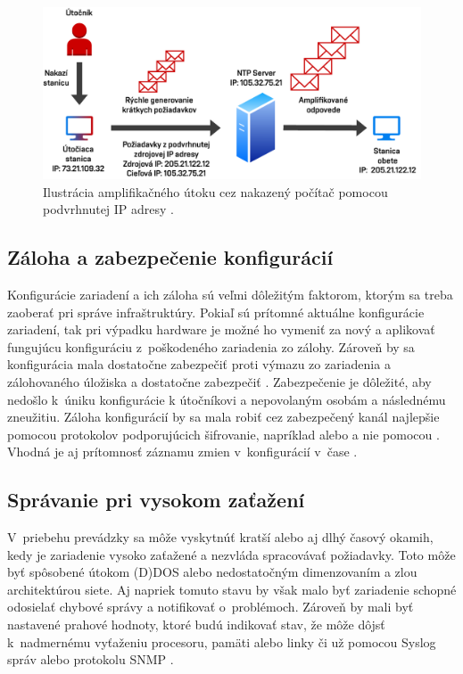\begin{figure}[H]
	\begin{center}
		\includegraphics[scale=0.75]{obrazky/ntp_amplification.pdf}
	\end{center}
	\caption[Amplifikačný útoku pomocou NTP]{Ilustrácia amplifikačného útoku cez nakazený počítač pomocou podvrhnutej IP adresy \cite{gTkmbyKon9H6tuAm}.}
	\label{fig:ntp-amp}
\end{figure} 

\subsection{Záloha a zabezpečenie konfigurácií}
Konfigurácie zariadení a ich záloha sú veľmi dôležitým faktorom, ktorým sa treba zaoberať pri správe infraštruktúry. Pokiaľ sú prítomné aktuálne konfigurácie zariadení, tak pri výpadku hardware je možné ho vymeniť za nový a aplikovať fungujúcu konfiguráciu z~poškodeného zariadenia zo zálohy. Zároveň by sa konfigurácia mala dostatočne zabezpečiť proti výmazu zo zariadenia a zálohovaného úložiska a dostatočne zabezpečiť \cite{McMillan2018}. Zabezpečenie je dôležité, aby nedošlo k~úniku konfigurácie k útočníkovi a nepovolaným osobám a následnému zneužitiu. Záloha konfigurácií by sa mala robiť cez zabezpečený kanál najlepšie pomocou protokolov podporujúcich šifrovanie, napríklad  alebo  a nie pomocou  \cite{Singh2018}. Vhodná je aj prítomnosť záznamu zmien v~konfigurácií v~čase \cite{McMillan2018}.

\subsection{Správanie pri vysokom zaťažení}
V~priebehu prevádzky sa môže vyskytnúť kratší alebo aj dlhý časový okamih, kedy je zariadenie vysoko zaťažené a nezvláda spracovávať požiadavky. Toto môže byť spôsobené útokom (D)DOS alebo nedostatočným dimenzovaním a zlou architektúrou siete. Aj napriek tomuto stavu by však malo byť zariadenie schopné odosielať chybové správy a notifikovať o~problémoch. Zároveň by mali byť nastavené prahové hodnoty, ktoré budú indikovať stav, že môže dôjsť k~nadmernému vyťaženiu procesoru, pamäti alebo linky či už pomocou Syslog správ alebo protokolu SNMP \cite{uYLsMtQInofenpV3}\cite{Singh2018}.

